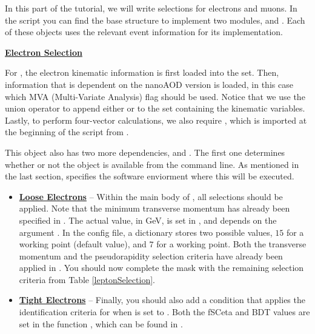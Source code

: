 In this part of the tutorial, we will write selections for electrons and muons.
In the script  you can find the base structure to implement two  modules,  and .
Each of these objects uses the relevant event information for its implementation.


\textbf{\underline{Electron Selection}}

For , the electron kinematic information is first loaded into the  set.
Then, information that is dependent on the nanoAOD version is loaded, in this case which MVA (Multi-Variate Analysis) flag should be used.
Notice that we use the union operator \code{|} to append either  or  to the set containing the kinematic variables.
Lastly, to perform four-vector calculations, we also require , which is imported at the beginning of the script from .


This  object also has two more dependencies,  and .
The first one determines whether or not the  object is available from the command line.
As mentioned in the last section,  specifies the software enviorment where this  will be executed.

\newpage
\begin{itemize}
    \item {
        \textbf{\underline{Loose Electrons}} -- Within the main body of , all selections should be applied.
        Note that the minimum transverse momentum has already been specified in .
        The actual value, in GeV, is set in , and depends on the argument .
        In the config file, a dictionary stores two possible values, $15$ for a  working point (default value), and $7$ for a  working point.
        Both the transverse momentum and the pseudorapidity selection criteria have already been applied in .
        You should now complete the mask with the remaining selection criteria from Table \ref{leptonSelection}.
    }
    \item {
        \textbf{\underline{Tight Electrons}} -- Finally, you should also add a condition that applies the identification criteria for when  is set to .
        Both the fSCeta and BDT values are set in the function , which can be found in .
    }
\end{itemize}

